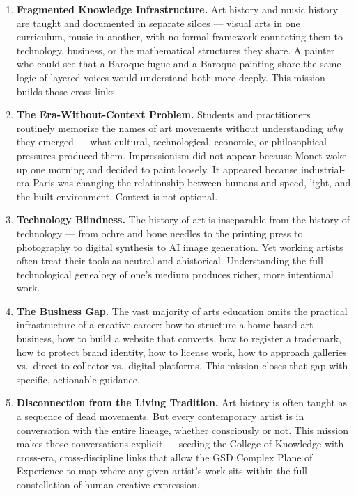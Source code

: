 \documentclass[11pt,letterpaper]{article}
\begin{document}
\begin{enumerate}[leftmargin=2em]

\item \textbf{Fragmented Knowledge Infrastructure.} Art history and music history are taught and documented in separate siloes --- visual arts in one curriculum, music in another, with no formal framework connecting them to technology, business, or the mathematical structures they share. A painter who could see that a Baroque fugue and a Baroque painting share the same logic of layered voices would understand both more deeply. This mission builds those cross-links.

\item \textbf{The Era-Without-Context Problem.} Students and practitioners routinely memorize the names of art movements without understanding \emph{why} they emerged --- what cultural, technological, economic, or philosophical pressures produced them. Impressionism did not appear because Monet woke up one morning and decided to paint loosely. It appeared because industrial-era Paris was changing the relationship between humans and speed, light, and the built environment. Context is not optional.

\item \textbf{Technology Blindness.} The history of art is inseparable from the history of technology --- from ochre and bone needles to the printing press to photography to digital synthesis to AI image generation. Yet working artists often treat their tools as neutral and ahistorical. Understanding the full technological genealogy of one's medium produces richer, more intentional work.

\item \textbf{The Business Gap.} The vast majority of arts education omits the practical infrastructure of a creative career: how to structure a home-based art business, how to build a website that converts, how to register a trademark, how to protect brand identity, how to license work, how to approach galleries vs.\ direct-to-collector vs.\ digital platforms. This mission closes that gap with specific, actionable guidance.

\item \textbf{Disconnection from the Living Tradition.} Art history is often taught as a sequence of dead movements. But every contemporary artist is in conversation with the entire lineage, whether consciously or not. This mission makes those conversations explicit --- seeding the College of Knowledge with cross-era, cross-discipline links that allow the GSD Complex Plane of Experience to map where any given artist's work sits within the full constellation of human creative expression.

\end{enumerate}
\end{document}
